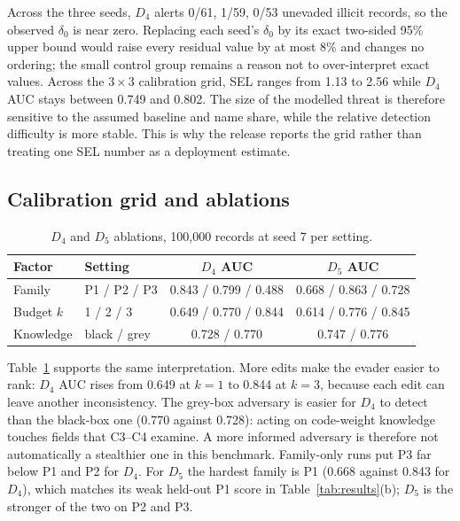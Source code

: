 \documentclass[conference]{IEEEtran}
\begin{document}
Across the three seeds, $D_4$ alerts 0/61, 1/59, 0/53 unevaded illicit
records, so the observed $\delta_0$ is near zero. Replacing each seed's
$\delta_0$ by its exact two-sided 95\% upper bound would raise every
residual value by at most 8\% and changes no
ordering; the small control group remains a reason not to over-interpret
exact values. Across the $3\times3$ calibration grid, SEL ranges from
1.13 to 2.56 while $D_4$ AUC stays between
0.749 and 0.802. The size of the modelled threat is
therefore sensitive to the assumed baseline and name share, while the
relative detection difficulty is more stable. This is why the release reports
the grid rather than treating one SEL number as a deployment estimate.

\subsection{Calibration grid and ablations}
\begin{table}[!t]
\caption{$D_4$ and $D_5$ ablations, 100,000 records at seed 7 per setting.}
\label{tab:ablations}
\centering
\scriptsize
\setlength{\tabcolsep}{3pt}
\begin{tabular}{@{}llcc@{}}
\toprule
Factor & Setting & $D_4$ AUC & $D_5$ AUC \\
\midrule
Family & P1 / P2 / P3 & 0.843 / 0.799 / 0.488 & 0.668 / 0.863 / 0.728 \\
Budget $k$ & 1 / 2 / 3 & 0.649 / 0.770 / 0.844 & 0.614 / 0.776 / 0.845 \\
Knowledge & black / grey & 0.728 / 0.770 & 0.747 / 0.776 \\
\bottomrule
\end{tabular}
\end{table}
Table~\ref{tab:ablations} supports the same interpretation. More edits make
the evader easier to rank: $D_4$ AUC rises from 0.649 at $k=1$ to
0.844 at $k=3$, because each edit can leave another inconsistency.
The grey-box adversary is easier for $D_4$ to detect than the black-box one
(0.770 against 0.728): acting on code-weight knowledge touches
fields that C3--C4 examine. A more informed adversary is therefore not
automatically a stealthier one in this benchmark. Family-only runs put P3 far
below P1 and P2 for $D_4$. For $D_5$ the hardest family is P1
(0.668 against 0.843 for $D_4$), which matches its weak
held-out P1 score in Table~\ref{tab:results}(b); $D_5$ is the stronger of
the two on P2 and P3.
\end{document}
